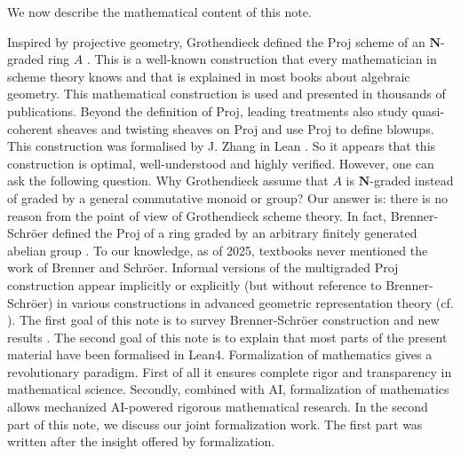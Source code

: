 \documentclass[graybox]{svmult}
\begin{document}
We now describe the mathematical content of this note. 

Inspired by projective geometry, Grothendieck defined the Proj scheme of an $\mathbf{N}$-graded ring $A$ \cite{Gr61}. This is a well-known construction that every mathematician in scheme theory knows and that is explained in most books about algebraic geometry. This mathematical construction is used and presented in thousands of publications. 
Beyond the definition of Proj, leading treatments also study quasi-coherent sheaves and twisting sheaves on Proj and use Proj to define blowups.  
This construction was formalised by J. Zhang in Lean \cite{Z23}. 
So it appears that this construction is optimal, well-understood and highly verified.  
However, one can ask the following question. Why Grothendieck assume that $A$ is $\mathbf{N}$-graded instead of graded by a general commutative monoid or group? 
Our answer is: there is no reason from the point of view of Grothendieck scheme theory. In fact, Brenner-Schröer defined the Proj of a ring graded by an arbitrary finitely generated abelian group \cite{BS03}.
To our knowledge, as of 2025, textbooks never mentioned the work of Brenner and Schröer.
 Informal versions of the multigraded Proj construction appear implicitly or
explicitly (but without reference to Brenner-Schröer) in various constructions in advanced geometric representation theory (cf. \cite{MR24}).
The first goal of this note is to survey Brenner-Schröer construction and new results \cite{BS03, MR24, MZ25}. The second goal of this note is to explain that most parts of the present material have been formalised in Lean4. Formalization of mathematics gives a revolutionary paradigm. First of all it ensures complete rigor and transparency in mathematical science. Secondly, combined with AI, formalization of mathematics allows mechanized AI-powered rigorous mathematical research. In the second part of this note, we discuss our joint formalization work. The first part was written after the insight offered by formalization. 
\end{document}
